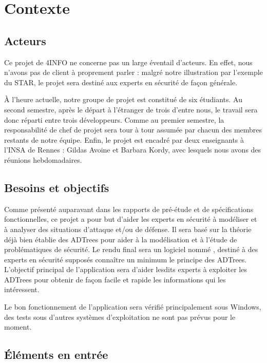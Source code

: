 \section{Contexte}
	\label{sec:contexte}


	\subsection{Acteurs}

	Ce projet de 4INFO ne concerne pas un large éventail d'acteurs. En effet, nous n'avons pas de client à proprement parler : malgré notre illustration par l'exemple du STAR, le projet sera destiné aux experts en sécurité de façon générale. 

	À l'heure actuelle, notre groupe de projet est constitué de six étudiants. Au second semestre, après le départ à l’étranger de trois d'entre nous, le travail sera donc réparti entre trois développeurs. Comme au premier semestre, la responsabilité de chef de projet sera tour à tour assumée par chacun des membres restants de notre équipe. Enfin, le projet est encadré par deux enseignants à l'INSA de Rennes : Gildas {\sc Avoine} et Barbara {\sc Kordy}, avec lesquels nous avons des réunions hebdomadaires.

	\subsection{Besoins et objectifs}

	Comme présenté auparavant dans les rapports de pré-étude et de spécifications fonctionnelles, ce projet a pour but d'aider les experts en sécurité à modéliser et à analyser des situations d'attaque et/ou de défense. Il sera basé sur la théorie déjà bien établie des ADTrees pour aider à la modélisation et à l'étude de problématiques de sécurité. Le rendu final sera un logiciel nommé \glasir{}, destiné à des experts en sécurité supposés connaître un minimum le principe des ADTrees. L'objectif principal de l'application sera d'aider lesdits experts à exploiter les ADTrees pour obtenir de façon facile et rapide les informations qui les intéressent.

	Le bon fonctionnement de l’application sera vérifié principalement sous Windows, des tests sous d'autres systèmes d'exploitation ne sont pas prévus pour le moment.

	\subsection{Éléments en entrée}

